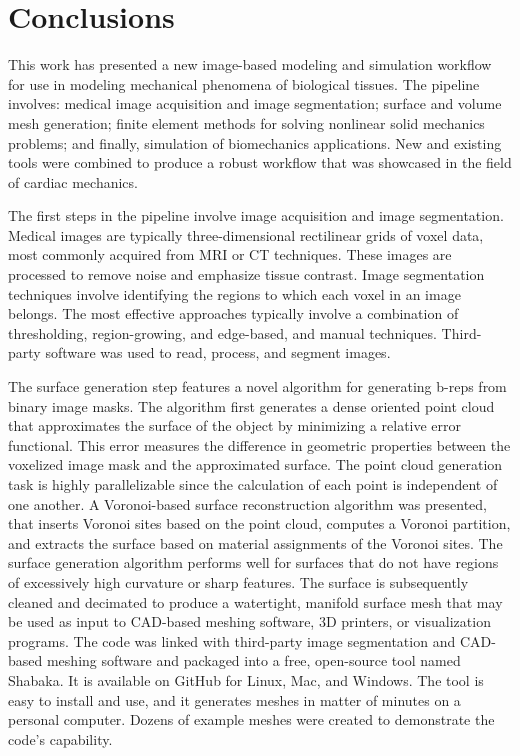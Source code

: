 \chapter{Conclusions}
\label{chap:7}
%

This work has presented a new image-based modeling and simulation workflow for use in modeling mechanical phenomena of biological tissues. The pipeline involves: medical image acquisition and image segmentation; surface and volume mesh generation; finite element methods for solving nonlinear solid mechanics problems; and finally, simulation of biomechanics applications. New and existing tools were combined to produce a robust workflow that was showcased in the field of cardiac mechanics.

The first steps in the pipeline involve image acquisition and image segmentation. Medical images are typically three-dimensional rectilinear grids of voxel data, most commonly acquired from MRI or CT techniques. These images are processed to remove noise and emphasize tissue contrast. Image segmentation techniques involve identifying the regions to which each voxel in an image belongs. The most effective approaches typically involve a combination of thresholding, region-growing, and edge-based, and manual techniques. Third-party software was used to read, process, and segment images.

The surface generation step features a novel algorithm for generating b-reps from binary image masks. The algorithm first generates a dense oriented point cloud that approximates the surface of the object by minimizing a relative error functional. This error measures the difference in geometric properties between the voxelized image mask and the approximated surface. The point cloud generation task is highly parallelizable since the calculation of each point is independent of one another. A Voronoi-based surface reconstruction algorithm was presented, that inserts Voronoi sites based on the point cloud, computes a Voronoi partition, and extracts the surface based on material assignments of the Voronoi sites. The surface generation algorithm performs well for surfaces that do not have regions of excessively high curvature or sharp features. The surface is subsequently cleaned and decimated to produce a watertight, manifold surface mesh that may be used as input to CAD-based meshing software, 3D printers, or visualization programs. The code was linked with third-party image segmentation and CAD-based meshing software and packaged into a free, open-source tool named Shabaka. It is available on GitHub for Linux, Mac, and Windows. The tool is easy to install and use, and it generates meshes in matter of minutes on a personal computer. Dozens of example meshes were created to demonstrate the code's capability.

